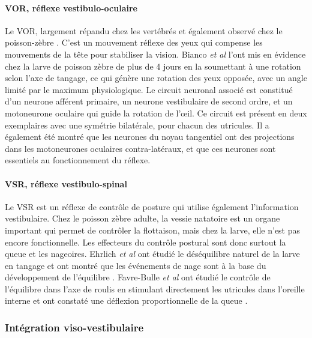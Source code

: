 \paragraph{VOR, réflexe vestibulo-oculaire}
Le VOR, largement répandu chez les vertébrés et également observé chez le poisson-zèbre \cite{bianco_tangential_2012}. C'est un mouvement réflexe des yeux qui compense les mouvements de la tête pour stabiliser la vision. Bianco \emph{et al} l'ont mis en évidence chez la larve de poisson zèbre de plus de 4 jours en la soumettant à une rotation selon l'axe de tangage, ce qui génère une rotation des yeux opposée, avec un angle limité par le maximum physiologique. Le circuit neuronal associé est constitué d'un neurone afférent primaire, un neurone vestibulaire de second ordre, et un motoneurone oculaire qui guide la rotation de l’œil. Ce circuit est présent en deux exemplaires avec une symétrie bilatérale, pour chacun des utricules. Il a également été montré que les neurones du noyau tangentiel ont des projections dans les motoneurones oculaires contra-latéraux, et que ces neurones sont essentiels au fonctionnement du réflexe. 

\paragraph{VSR, réflexe vestibulo-spinal}
Le VSR est un réflexe de contrôle de posture qui utilise également l'information vestibulaire. Chez le poisson zèbre adulte, la vessie natatoire est un organe important qui permet de contrôler la flottaison, mais chez la larve, elle n'est pas encore fonctionnelle. Les effecteurs du contrôle postural sont donc surtout la queue et les nageoires. Ehrlich \emph{et al} ont étudié le déséquilibre naturel de la larve en tangage et ont montré que les événements de nage sont à la base du développement de l'équilibre \cite{ehrlich_control_2017}. Favre-Bulle \emph{et al} ont étudié le contrôle de l'équilibre dans l'axe de roulis en stimulant directement les utricules dans l'oreille interne et ont constaté une déflexion proportionnelle de la queue \cite{favre-bulle_cellular-resolution_2018}.

\subsubsection{Intégration viso-vestibulaire}

